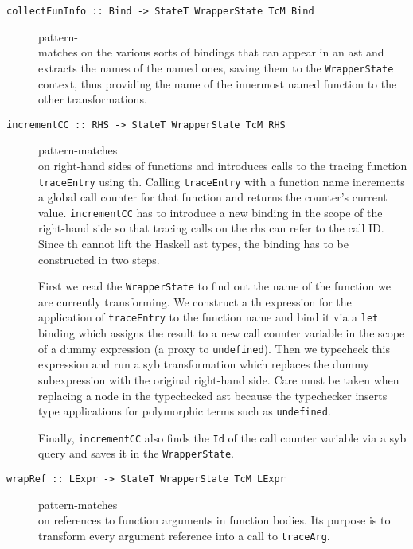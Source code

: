 \documentclass[thesis=B,english]{FITthesis}[2019/12/23]
\newcommand{\hsType}[1]{\texttt{#1}}
\newcommand{\hsIdent}[1]{\texttt{#1}}
\newcommand{\hsCode}[1]{\texttt{#1}}
\begin{document}
\begin{description}
	\item[\hsCode{collectFunInfo :: Bind -> StateT WrapperState TcM Bind}]
		pattern-\\matches on the various sorts of bindings that can appear in
		an \acrshort{ast} and extracts the names of the named ones, saving them
		to the \hsType{WrapperState} context, thus providing the name of the
		innermost named function to the other transformations.

	\item[\hsCode{incrementCC :: RHS -> StateT WrapperState TcM RHS}]
		pattern-matches \\on right-hand sides of functions and introduces calls
		to the tracing function \hsIdent{traceEntry} using \acrfull{th}.
		Calling \hsIdent{traceEntry} with a function name increments a global
		call counter for that function and returns the counter's current value.
		\hsIdent{incrementCC} has to introduce a new binding in the scope of
		the right-hand side so that tracing calls on the \acrshort{rhs} can
		refer to the call ID.  Since \acrshort{th} cannot lift the Haskell
		\acrshort{ast} types, the binding has to be constructed in two steps.

		First we read the \hsType{WrapperState} to find out the name of the
		function we are currently transforming. We construct a \acrshort{th}
		expression for the application of \hsIdent{traceEntry} to the function
		name and bind it via a \hsCode{let} binding which assigns the result to
		a new call counter variable in the scope of a dummy expression (a proxy
		to \hsIdent{undefined}). Then we typecheck this expression and run a
		\acrshort{syb} transformation which replaces the dummy subexpression
		with the original right-hand side. Care must be taken when replacing a
		node in the typechecked \acrshort{ast} because the typechecker inserts
		type applications for polymorphic terms such as \hsIdent{undefined}.

		Finally, \hsIdent{incrementCC} also finds the \hsType{Id} of the call
		counter variable via a \acrshort{syb} query and saves it in the
		\hsType{WrapperState}.

	\item[\hsCode{wrapRef :: LExpr -> StateT WrapperState TcM LExpr}]
		pattern-matches \\on references to function arguments in function
		bodies. Its purpose is to transform every argument reference into a
		call to \hsIdent{traceArg}.


\end{description}
\end{document}
